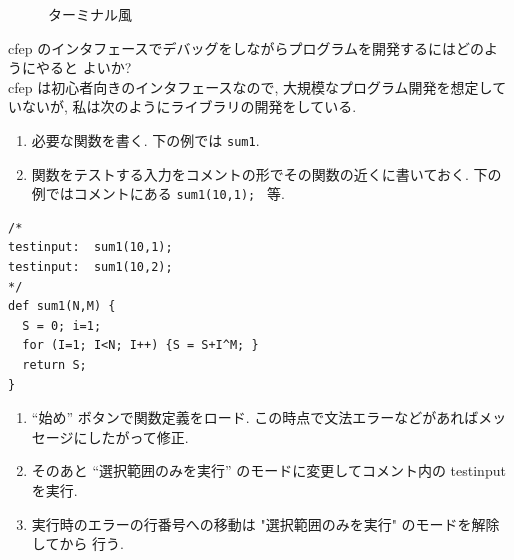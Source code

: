 \documentclass{jbook}
\begin{document}
\begin{figure}[tbh]
\caption{ターミナル風} \label{fig:sl2}
\end{figure}


\noindent
cfep のインタフェースでデバッグをしながらプログラムを開発するにはどのようにやると
よいか? \\
cfep は初心者向きのインタフェースなので,
大規模なプログラム開発を想定していないが, 
私は次のようにライブラリの開発をしている.

\begin{enumerate}
\item 必要な関数を書く. 下の例では {\tt sum1}.
\item 関数をテストする入力をコメントの形でその関数の近くに書いておく.
下の例ではコメントにある {\tt sum1(10,1); } 等.
\end{enumerate}


\begin{screen}
\begin{verbatim}
/*
testinput:  sum1(10,1);
testinput:  sum1(10,2);
*/
def sum1(N,M) {
  S = 0; i=1;
  for (I=1; I<N; I++) {S = S+I^M; }
  return S;
}
\end{verbatim}
\end{screen}

\begin{enumerate}
\item ``始め'' ボタンで関数定義をロード. 
この時点で文法エラーなどがあればメッセージにしたがって修正.
\item そのあと ``選択範囲のみを実行'' のモードに変更してコメント内の testinput を実行.
\item 実行時のエラーの行番号への移動は "選択範囲のみを実行" のモードを解除してから
行う.   
\end{enumerate}
\end{document}
